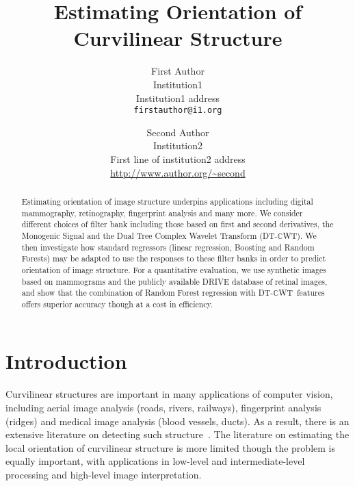 \documentclass[10pt,twocolumn,letterpaper]{article}
\def\dtcwt{DT-$\mathbb{C}$WT}
\begin{document}
\def\ttl{Estimating Orientation of Curvilinear Structure}
\title{\ttl}

\author{First Author\\
Institution1\\
Institution1 address\\
{\tt\small firstauthor@i1.org}
\and
Second Author\\
Institution2\\
First line of institution2 address\\
{\small\url{http://www.author.org/~second}}
}

\maketitle

\begin{abstract}
Estimating orientation of image structure underpins applications including digital mammography, retinography, fingerprint analysis and many more. We consider different choices of filter bank including those based on first and second derivatives, the Monogenic Signal and the Dual Tree Complex Wavelet Transform (\dtcwt). We then investigate how standard regressors (linear regression, Boosting and Random Forests) may be adapted to use the responses to these filter banks in order to predict orientation of image structure. For a quantitative evaluation, we use synthetic images based on mammograms and the publicly available DRIVE database of retinal images, and show that the combination of Random Forest regression with \dtcwt~features offers superior accuracy though at a cost in efficiency. \end{abstract}

\def\figpath{./figs}

\section{Introduction}
\label{s:introduction}
Curvilinear structures are important in many applications of computer vision, including aerial image analysis (roads, rivers, railways), fingerprint analysis (ridges) and medical image analysis (blood vessels, ducts). As a result, there is an extensive literature on detecting such structure~\cite{Papari_Petkov_IVC11,Staal_etal_TMI04,Ricci_Perfetti_TMI07}. The literature on estimating the local orientation of curvilinear structure is more limited though the problem is equally important, with applications in low-level and intermediate-level processing and high-level image interpretation.
\end{document}
